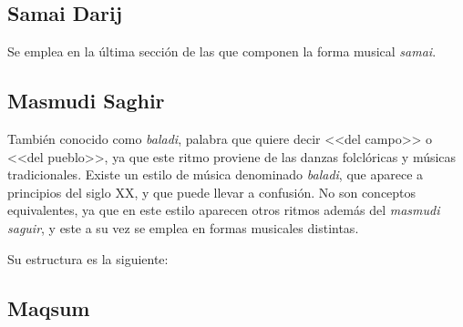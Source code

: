
\subsection{Samai Darij}

Se emplea en la última sección de las que componen la forma musical \emph{samai}.

\begin{center}
\end{center}


\subsection{Masmudi Saghir}

También conocido como \emph{baladi}, palabra que quiere decir <<del campo>> o <<del pueblo>>, ya que este ritmo proviene de las danzas folclóricas y músicas tradicionales. Existe un estilo de música denominado \emph{baladi}, que aparece a principios del siglo \textsc{XX}, y que puede llevar a confusión. No son conceptos equivalentes, ya que en este estilo aparecen otros ritmos además del \emph{masmudi saguir}, y este a su vez se emplea en formas musicales distintas.

Su estructura es la siguiente:

\begin{center}
\end{center}


\subsection{Maqsum}

